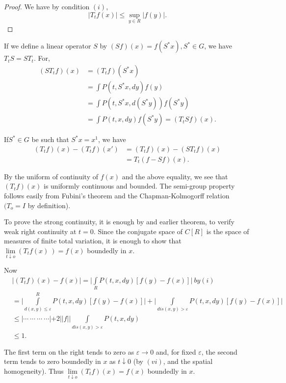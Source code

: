 \begin{proof}
 We have by condition $(i)$,
 $$
 | T_t f(x) | \le \sup_{y \in R} | f(y) |.
 $$
\end{proof}

If we define a linear operator $S$ by $(Sf)(x) = f(S^*x), S^* \in G$, we have
$T_t S = ST_t$. For, 
\begin{align*}
 (S T_t f) (x) & = (T_t f) (S^*x)\\
 & = \int P(t, S^* x, dy) f(y)\\
 & = \int P(t, S^*x, d (S^* y)) f(S^* y)\\
 & = \int P(t, x, dy) f(S^* y) = (T_t S f) (x).
\end{align*}

If\pageoriginale $S^* \in G$ be such that $S^* x = x^1 $, we have
\begin{align*}
 (T_t f ) (x) - (T_t f) (x') & = (T_t f) (x) - (S T_t f) (x)\\
 & = T_t (f- S f) (x).
\end{align*}

By the uniform of continuity of $f(x)$ and the above equality, we see
that $(T_t f) (x)$ is uniformly continuous and bounded. The semi-group
property follows easily from Fubini's theorem and the
Chapman-Kolmo\-gorff relation $(T_o = I$ by definition). 

To prove the strong continuity, it is enough by and earlier theorem,
to verify weak right continuity at $t = 0$. Since the conjugate space
of $C[R]$ is the space of measures of finite total variation, it is
enough to show that $\lim\limits_{t \downarrow o}(T_t f(x) ~) = f(x)$
boundedly in $x$. 

Now 
\begin{align*}
 & | (T_t f) (x) - f(x) | = \big | \int\limits_{R} P(t, x, dy) [f (y)
  - f(x) ] \big | ~by (i)\\ 
 & = \big | \int\limits^R_{d(x, y) \le \varepsilon} P(t, x, dy) [f(y)
  - f(x) ] \big | + \big | \int\limits_{dis (x, y) > \varepsilon}
 P(t, x, dy) [f (y) - f(x)] \big|\\ 
 & \le \big | \cdots ~ \cdots ~ \cdots ~ \cdots | + 2 || f ||
 \int\limits_{dis (x, y) > \varepsilon} P(t, x, dy)\\ 
 & \le 1. 
\end{align*}

The first term on the right tends to zero as $\varepsilon \rightarrow
0$ and, for fixed $\varepsilon$, the second term tends to zero
boundedly in $x$ as $t \downarrow 0$ (by $(vi)$, and the spatial
homogeneity). Thus $\lim\limits_{t \downarrow o} (T_t f) (x) = f(x) $
boundedly in $x$. 


